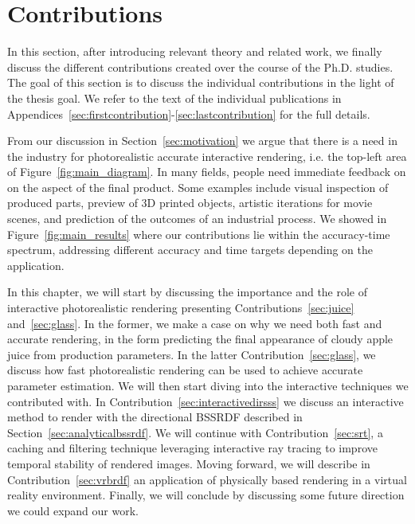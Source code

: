 \chapter{Contributions}
\label{sec:contributions}
In this section, after introducing relevant theory and related work, we finally discuss the different contributions created over the course of the Ph.D. studies. The goal of this section is to discuss the individual contributions in the light of the thesis goal. We refer to the text of the individual publications in Appendices~\ref{sec:firstcontribution}-\ref{sec:lastcontribution} for the full details.

From our discussion in Section~\ref{sec:motivation} we argue that there is a need in the industry for photorealistic accurate interactive rendering, i.e. the top-left area of Figure~\ref{fig:main_diagram}. In many fields, people need immediate feedback on on the aspect of the final product. Some examples include visual inspection of produced parts, preview of 3D printed objects, artistic iterations for movie scenes, and prediction of the outcomes of an industrial process. We showed in Figure~\ref{fig:main_results} where our contributions lie within the accuracy-time spectrum, addressing different accuracy and time targets depending on the application.

In this chapter, we will start by discussing the importance and the role of interactive photorealistic rendering presenting Contributions~\ref{sec:juice} and~\ref{sec:glass}. In the former, we make a case on why we need both fast and accurate rendering, in the form predicting the final appearance of cloudy apple juice from production parameters. In the latter Contribution~\ref{sec:glass}, we discuss how fast photorealistic rendering can be used to achieve accurate parameter estimation. We will then start diving into the interactive techniques we contributed with. In Contribution~\ref{sec:interactivedirsss} we discuss an interactive method to render with the directional BSSRDF described in Section~\ref{sec:analyticalbssrdf}. We will continue with Contribution~\ref{sec:srt}, a caching and filtering technique leveraging interactive ray tracing to improve temporal stability of rendered images. Moving forward, we will describe in Contribution~\ref{sec:vrbrdf} an application of physically based rendering in a virtual reality environment. Finally, we will conclude by discussing some future direction we could expand our work.

